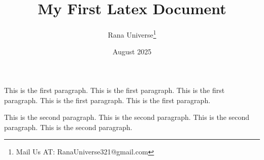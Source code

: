 \documentclass[12pt, letterpaper]{article}
\title{My First Latex Document}
\author{Rana Universe\thanks{Mail Us AT: RanaUniverse321@gmail.com}}
\date{August 2025}
\begin{document}
\maketitle


This is the first paragraph.
This is the first paragraph.
This is the first paragraph.
This is the first paragraph.
This is the first paragraph.


\vspace{1em}



This is the second paragraph.
This is the second paragraph.
This is the second paragraph.
This is the second paragraph.








\end{document}
